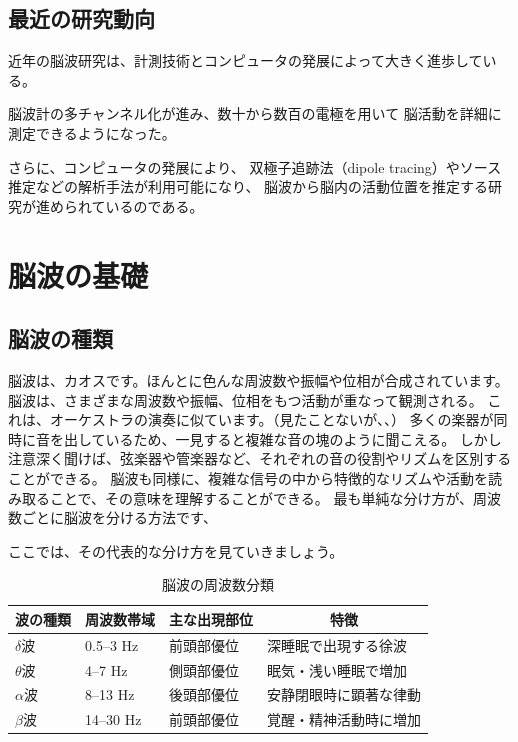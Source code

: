 \subsection{最近の研究動向}

近年の脳波研究は、計測技術とコンピュータの発展によって大きく進歩している。

脳波計の多チャンネル化が進み、数十から数百の電極を用いて
脳活動を詳細に測定できるようになった。

さらに、コンピュータの発展により、
双極子追跡法（dipole tracing）やソース推定などの解析手法が利用可能になり、
脳波から脳内の活動位置を推定する研究が進められているのである。

\section{脳波の基礎}

\subsection{脳波の種類}
脳波は、カオスです。ほんとに色んな周波数や振幅や位相が合成されています。
脳波は、さまざまな周波数や振幅、位相をもつ活動が重なって観測される。
これは、オーケストラの演奏に似ています。（見たことないが、、）
多くの楽器が同時に音を出しているため、一見すると複雑な音の塊のように聞こえる。
しかし注意深く聞けば、弦楽器や管楽器など、それぞれの音の役割やリズムを区別することができる。
脳波も同様に、複雑な信号の中から特徴的なリズムや活動を読み取ることで、その意味を理解することができる。
最も単純な分け方が、周波数ごとに脳波を分ける方法です、

ここでは、その代表的な分け方を見ていきましょう。
\begin{table}[h]
\centering
\caption{脳波の周波数分類}
\begin{tabular}{llll}
\toprule
\multicolumn{1}{c}{波の種類} &
\multicolumn{1}{c}{周波数帯域} &
\multicolumn{1}{c}{主な出現部位} &
\multicolumn{1}{c}{特徴} \\
\midrule
$\delta$波 & 0.5--3 Hz & 前頭部優位 & 深睡眠で出現する徐波 \\
$\theta$波 & 4--7 Hz & 側頭部優位 & 眠気・浅い睡眠で増加 \\
$\alpha$波 & 8--13 Hz & 後頭部優位 & 安静閉眼時に顕著な律動 \\
$\beta$波 & 14--30 Hz & 前頭部優位 & 覚醒・精神活動時に増加 \\
\bottomrule
\end{tabular}
\end{table}

